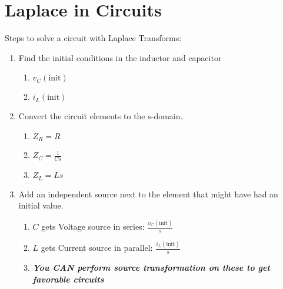 \section*{Laplace in Circuits}
Steps to solve a circuit with Laplace Transforms:
	\begin{enumerate}
		\item Find the initial conditions in the inductor and capacitor
		\begin{enumerate}
			\item $v_{C} \left( \text{init} \right)$
			\item $i_{L} \left( \text{init} \right)$
		\end{enumerate}
		
		\item Convert the circuit elements to the s-domain.
		\begin{enumerate}
			\item $Z_{R} = R$
			\item $Z_{C} = \frac{1}{Cs}$
			\item $Z_{L} = Ls$
		\end{enumerate}
		
		\item Add an independent source next to the element that might have had an initial value.
			\begin{enumerate}
				\item $C$ gets Voltage source in series: $\frac{v_{C} \left( \text{init} \right)}{s}$
				\item $L$ gets Current source in parallel: $\frac{i_{L}  \left( \text{init} \right)}{s}$
				\item \emph{\textbf{You CAN perform source transformation on these to get favorable circuits}}
			\end{enumerate}
	\end{enumerate}
\vspace{-3mm}